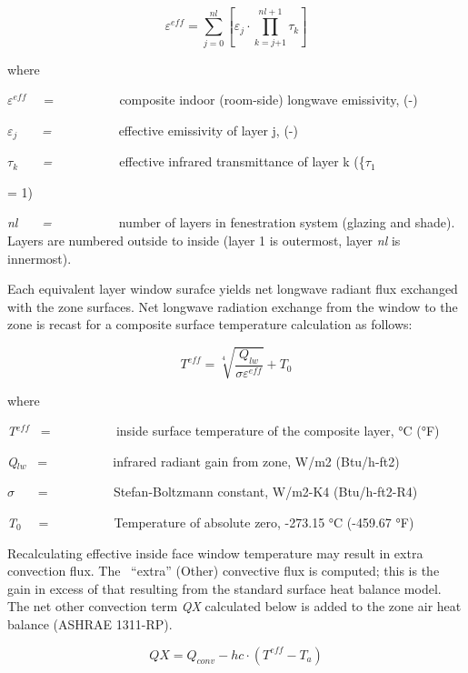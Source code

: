 {\begin{equation}
{\varepsilon ^{eff}} = \sum\limits_{j = 0}^{nl} {\left[ {{\varepsilon_j} \cdot \prod\limits_{k = j{ + 1}}^{nl + {1}} {{\tau_k}} } \right]}
\end{equation}

where

\emph{$\varepsilon$\(^{eff}\)}~~ = ~~~~~~~~~ composite indoor (room-side) longwave emissivity, (-)

\emph{$\varepsilon$\(_{j}\)~~~ = ~~~~~~~~~} effective emissivity of layer j, (-)

\emph{$\tau$\(_{k}\)~~~ = ~~~~~~~~~} effective infrared transmittance of layer k (\{$\tau$\(_{1}\)} = 1)

\emph{nl~~~ = ~~~~~~~~~} number of layers in fenestration system (glazing and shade). Layers are numbered outside to inside (layer 1 is outermost, layer \emph{nl} is innermost).

Each equivalent layer window surafce yields net longwave radiant flux exchanged with the zone surfaces. Net longwave radiation exchange from the window to the zone is recast for a composite surface temperature calculation as follows:

\begin{equation}
{T^{eff}} = \sqrt[4]{{\frac{{{Q_{lw}}}}{{\sigma {\varepsilon ^{eff}}}}}} + {T_0}
\end{equation}

where

\emph{T\(^{eff}\)}~ = ~~~~~~~~~ inside surface temperature of the composite layer, °C (°F)

\emph{Q\(_{lw}\)}~ = ~~~~~~~~~ infrared radiant gain from zone, W/m2 (Btu/h-ft2)

\emph{$\sigma$}~~~ = ~~~~~~~~~ Stefan-Boltzmann constant, W/m2-K4 (Btu/h-ft2-R4)

\emph{T\(_{0}\)}~~ = ~~~~~~~~~ Temperature of absolute zero, -273.15 °C (-459.67 °F)

Recalculating effective inside face window temperature may result in extra convection flux. The~ ``extra'' (Other) convective flux is computed; this is the gain in excess of that resulting from the standard surface heat balance model. The net other convection term \emph{QX} calculated below is added to the zone air heat balance (ASHRAE 1311-RP).

\begin{equation}
QX = {Q_{conv}} - hc \cdot ({T^{eff}} - {T_a})
\end{equation}

